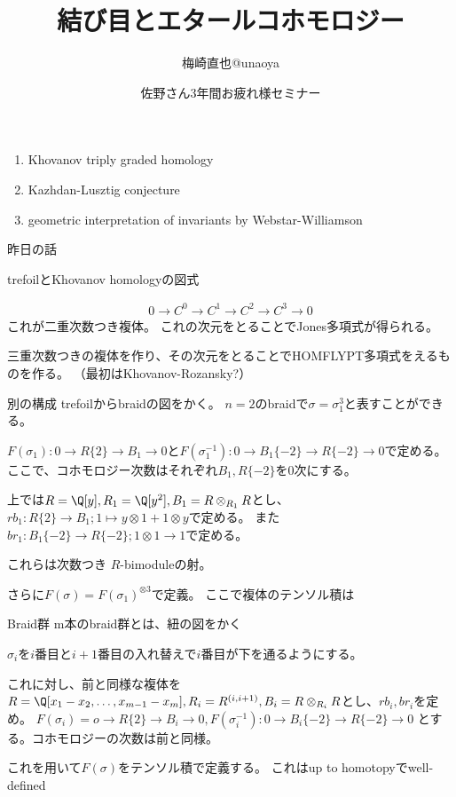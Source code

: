 \documentclass[dvipdfmx]{beamer}
\title{結び目とエタールコホモロジー}
\author{梅崎直也@unaoya}
\date{佐野さん3年間お疲れ様セミナー}
\begin{document}
\begin{frame}
\maketitle
\end{frame}

\begin{frame}
\begin{enumerate}
\item Khovanov triply graded homology
\item Kazhdan-Lusztig conjecture
\item geometric interpretation of invariants by Webstar-Williamson
\end{enumerate}
\end{frame}

\begin{frame}{昨日の話}

  trefoilとKhovanov homologyの図式

  \begin{align*}
    0 \to C^0 \to C^1 \to C^2 \to C^3 \to 0
  \end{align*}
  これが二重次数つき複体。
  これの次元をとることでJones多項式が得られる。

  三重次数つきの複体を作り、その次元をとることでHOMFLYPT多項式をえるものを作る。
  （最初はKhovanov-Rozansky?）
\end{frame}

\begin{frame}{別の構成}
  trefoilからbraidの図をかく。
  $n=2$のbraidで$\sigma=\sigma_1^3$と表すことができる。

  $F(\sigma_1):0\to R\{2\} \to B_1 \to0$と$F(\sigma_1^{-1}):0 \to B_1\{-2\} \to R\{-2\}\to0$で定める。
  ここで、コホモロジー次数はそれぞれ$B_1, R\{-2\}$を$0$次にする。

  上では$R=\Q[y], R_1=\Q[y^2], B_1=R\otimes_{R_1}R$とし、
  $rb_1:R\{2\} \to B_1; 1 \mapsto y\otimes1+1\otimes y$で定める。
  また$br_1:B_1\{-2\} \to R\{-2\}; 1\otimes 1\to1$で定める。

  これらは次数つき $R$-bimoduleの射。

  さらに$F(\sigma)=F(\sigma_1)^{\otimes 3}$で定義。
  ここで複体のテンソル積は
\end{frame}

\begin{frame}{Braid群}
  m本のbraid群とは、紐の図をかく

  $\sigma_i$を$i$番目と$i+1$番目の入れ替えで$i$番目が下を通るようにする。

  これに対し、前と同様な複体を
  $R=\Q[x_1-x_2, \ldots, x_{m-1}-x_m], R_i=R^{(i, i+1)}, B_i=R\otimes_{R_i}R$とし、$rb_i, br_i$を定め。
  $F(\sigma_i)=o\to R\{2\} \to B_i \to0, F(\sigma_i^{-1}):0 \to B_i\{-2\} \to R\{-2\} \to 0$
  とする。コホモロジーの次数は前と同様。

  これを用いて$F(\sigma)$をテンソル積で定義する。
  これはup to homotopyでwell-defined
\end{frame}
\end{document}

